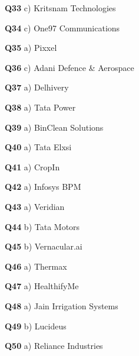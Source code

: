 \textbf{Q33} c) Kritsnam Technologies\par
\textbf{Q34} c) One97 Communications\par
\textbf{Q35} a) Pixxel\par
\textbf{Q36} c) Adani Defence & Aerospace\par
\textbf{Q37} a) Delhivery\par
\textbf{Q38} a) Tata Power\par
\textbf{Q39} a) BinClean Solutions\par
\textbf{Q40} a) Tata Elxsi\par
\textbf{Q41} a) CropIn\par
\textbf{Q42} a) Infosys BPM\par
\textbf{Q43} a) Veridian\par
\textbf{Q44} b) Tata Motors\par
\textbf{Q45} b) Vernacular.ai\par
\textbf{Q46} a) Thermax\par
\textbf{Q47} a) HealthifyMe\par
\textbf{Q48} a) Jain Irrigation Systems\par
\textbf{Q49} b) Lucideus\par
\textbf{Q50} a) Reliance Industries\par